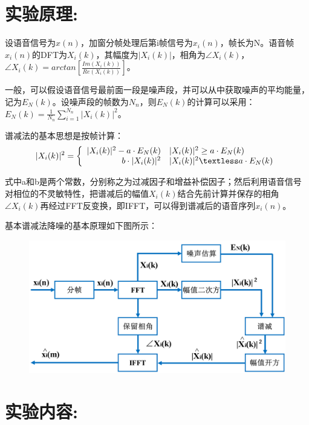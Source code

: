 \documentclass[a4paper,11pt,UTF8]{ctexart}
\newcommand{\bottomcaption}{%
\setlength{\abovecaptionskip}{6pt}%
\setlength{\belowcaptionskip}{6pt}%
\caption}
\newcommand{\xiaowuhao}{\fontsize{9pt}{\baselineskip}\selectfont}   %
\begin{document}
\section{实验原理:}

设语音信号为$x(n)$，加窗分帧处理后第i帧信号为$x_i(n)$，帧长为N。语音帧$x_i(n)$的DFT为$X_i(k)$，其幅度为$|X_i(k)|$，相角为$\angle X_i(k)$，$\angle X_i(k)=arctan[\frac{Im(X_i(k))}{Re(X_i(k))}]$。\par 

一般，可以假设语音信号最前面一段是噪声段，并可以从中获取噪声的平均能量，记为$E_N(k)$。设噪声段的帧数为$N_n$，则$E_N(k)$的计算可以采用：$E_N(k)=\frac{1}{N_n}\sum_{i=1}^{N_n}|X_i(k)|^2$。\par 

谱减法的基本思想是按帧计算：
	\begin{equation}
	|X_i(k)|^2 = \left \{
	\begin{array}{rl}
		|X_i(k)|^2-a\cdot E_N(k) & |X_i(k)|^2\geq a\cdot E_N(k) \\
		b\cdot |X_i(k)|^2        & |X_i(k)|^2\textless a\cdot E_N(k)
	\end{array}
	\right. 
	\nonumber
	\end{equation}
	
式中a和b是两个常数，分别称之为过减因子和增益补偿因子；然后利用语音信号对相位的不灵敏特性，把谱减后的幅值$X_i(k)$结合先前计算并保存的相角$\angle X_i(k)$再经过FFT反变换，即IFFT，可以得到谱减后的语音序列$x_i(n)$。\par 

基本谱减法降噪的基本原理如下图所示：
\begin{figure}[!htbp]
	\centering
	\includegraphics[width=\textwidth]{principle}
	\bottomcaption{\xiaowuhao{基本谱减法原理图}}
\end{figure}

\section{实验内容:}
\end{document}
